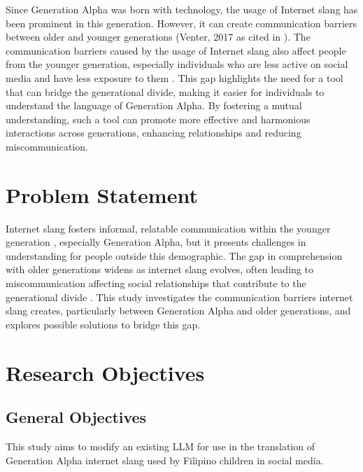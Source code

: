 Since Generation Alpha was born with technology, the usage of Internet slang has been prominent in this generation. However, it can create communication barriers between older and younger generations (Venter, 2017 as cited in \cite{Ghazali_Abdullah_2021}). The communication barriers caused by the usage of Internet slang also affect people from the younger generation, especially individuals who are less active on social media and have less exposure to them \cite{Vacalares_Salas_Babac_Cagalawan_Calimpong_2023}. This gap highlights the need for a tool that can bridge the generational divide, making it easier for individuals to understand the language of Generation Alpha. By fostering a mutual understanding, such a tool can promote more effective and harmonious interactions across generations, enhancing relationships and reducing miscommunication.

\section{Problem Statement}
\label{sec:problem_statement}
Internet slang fosters informal, relatable communication within the younger generation \cite{Ghazali_Abdullah_2021}, especially Generation Alpha, but it presents challenges in understanding for people outside this demographic. The gap in comprehension with older generations widens as internet slang evolves, often leading to miscommunication affecting social relationships that contribute to the generational divide \cite{Vacalares_Salas_Babac_Cagalawan_Calimpong_2023}. This study investigates the communication barriers internet slang creates, particularly between Generation Alpha and older generations, and explores possible solutions to bridge this gap.

\section{Research Objectives}
\label{sec:research_objectives}

\subsection{General Objectives}
\label{sec:general_objectives}
This study aims to modify an existing LLM for use in the translation of Generation Alpha internet slang used by Filipino children in social media.
